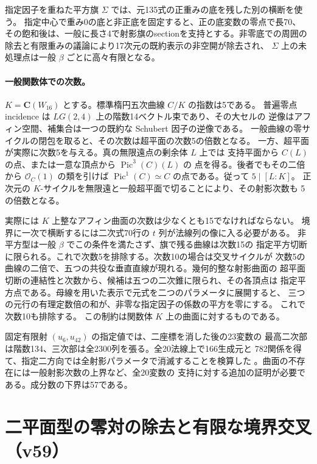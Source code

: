 \documentclass[11pt,a4paper]{ltjsarticle}
\theoremstyle{remark}
\begin{document}
指定因子を重ねた平方旗 $\Sigma$ では、元135式の正重みの底を残した別の横断を使う。
指定中心で重み0の底と非正底を固定すると、正の底変数の零点で長70、
その飽和後は、一般に長さ4で射影旗のsectionを支持とする。非零底での周囲の
除去と有限重みの議論により17次元の既約表示の非空開が除去され、
$\Sigma$ 上の未処理点は一般 $\beta$ ごとに高々有限となる\cite{sigma-v58}。

\paragraph{一般関数体での次数。}
$K=\mathbf C(W_{16})$ とする。標準楕円五次曲線 $C/K$ の指数は5である。
普遍零点 incidence は $LG(2,4)$ 上の階数14ベクトル束であり、その大セルの
逆像はアフィン空間、補集合は一つの既約な Schubert 因子の逆像である。
一般曲線の零サイクルの閉包を取ると、その次数は超平面の次数5の倍数となる。
一方、超平面が実際に次数5を与える。真の無限遠点の剰余体 $L$ 上では
支持平面から $C(L)$ の点、または一意な頂点から $\operatorname{Pic}^3(C)(L)$ の
点を得る。後者でもその二倍から $\mathcal O_C(1)$ の類を引けば
$\operatorname{Pic}^1(C)\simeq C$ の点である。従って $5\mid[L:K]$。
正次元の $K$-サイクルを無限遠と一般超平面で切ることにより、その射影次数も
5の倍数となる\cite{index-v58}。

実際には $K$ 上整なアフィン曲面の次数は少なくとも15でなければならない。
境界に一次で横断するには二次式70行の $t$ 列が法線列の像に入る必要がある。
非平方型は一般 $\beta$ でこの条件を満たさず、旗で残る曲線は次数15の
指定平方切断に限られる。これで次数5を排除する。次数10の場合は交叉サイクルが
次数5の曲線の二倍で、五つの共役な垂直直線が現れる。幾何的整な射影曲面の
超平面切断の連結性と次数から、候補は五つの二次錐に限られ、その各頂点は
指定平方点である。母線を用いた表示で元式を二つのパラメータに展開すると、
三つの元行の有理定数倍の和が、非零な指定因子の係数の平方を零にする。
これで次数10も排除する\cite{degree-low-v58,degree-ten-v58}。
この制約は関数体 $K$ 上の曲面に対するものである。

固定有限射 $(u_6,u_{42})$ の指定値では、二座標を消した後の23変数の
最高二次部は階数134、三次部は全2300列を張る。全20法線上で166生成元と
782関係を得て、指定二方向では全射影パラメータで消滅することを検算した
\cite{pair-v58}。曲面の不存在には一般射影次数の上界など、全20変数の
支持に対する追加の証明が必要である。成分数の下界は57である。

\section{二平面型の零対の除去と有限な境界交叉（v59）}
\end{document}
